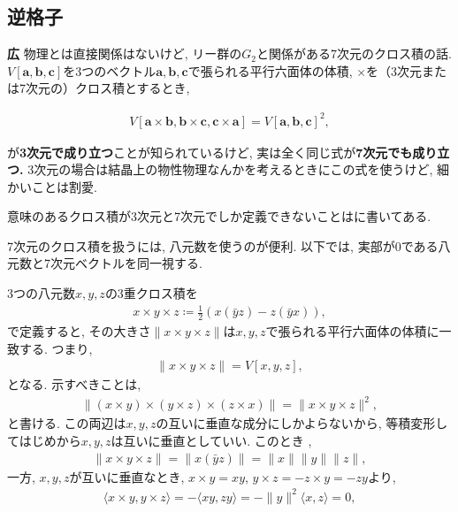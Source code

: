 \documentclass{ltjsarticle}
\theoremstyle{definition}
\begin{document}
\subsection{逆格子}
\noindent
\textbf{広} 物理とは直接関係はないけど, リー群の$G_2$と関係がある7次元のクロス積の話.
$V[\bm a,\bm b,\bm c]$を3つのベクトル$\bm a,\bm b,\bm c$で張られる平行六面体の体積, $\times$を（3次元または7次元の）クロス積とするとき,
\begin{tcolorbox}
\begin{align}
V[\bm a\times\bm b,\bm b\times\bm c,\bm c\times\bm a]=V[\bm a,\bm b,\bm c]^2,
\end{align}
\end{tcolorbox}
\noindent
が\textbf{3次元で成り立つ}ことが知られているけど, 実は全く同じ式が\textbf{7次元でも成り立つ.} 3次元の場合は結晶上の物性物理なんかを考えるときにこの式を使うけど, 細かいことは割愛.
\par
意味のあるクロス積が3次元と7次元でしか定義できないことは\cite{bib_cross_prod2}に書いてある.
\par
7次元のクロス積を扱うには, 八元数を使うのが便利. 以下では, 実部が0である八元数と7次元ベクトルを同一視する.\par
3つの八元数$x, y, z$の3重クロス積を
\begin{gather}
  x\times y\times z\coloneqq\frac12(x(\bar yz)-z(\bar yx)),
\end{gather}
で定義すると, その大きさ$\|x\times y\times z\|$は$x, y, z$で張られる平行六面体の体積に一致する. つまり,
\begin{gather}
  \|x\times y\times z\|=V[x, y, z],
\end{gather}
となる. 示すべきことは,
\begin{gather}
  \|(x\times y)\times(y\times z)\times(z\times x)\|=\|x\times y\times z\|^2,\label{eq:triproduct_result}
\end{gather}
と書ける. この両辺は$x, y, z$の互いに垂直な成分にしかよらないから, 等積変形してはじめから$x, y, z$は互いに垂直としていい. このとき
\cite{bib_cross_prod1},
\begin{gather}
  \|x\times y\times z\|=\|x(\bar yz)\|=\|x\|\|y\|\|z\|\label{eq:triproduct_magnitude},
\end{gather}
一方, $x, y, z$が互いに垂直なとき, $x\times y=xy$, $y\times z=-z\times y=-zy$より,
\begin{gather}
  \langle x\times y, y\times z\rangle=-\langle xy, zy\rangle=-\|y\|^2\langle x,z\rangle=0,
\end{gather}
\end{document}
